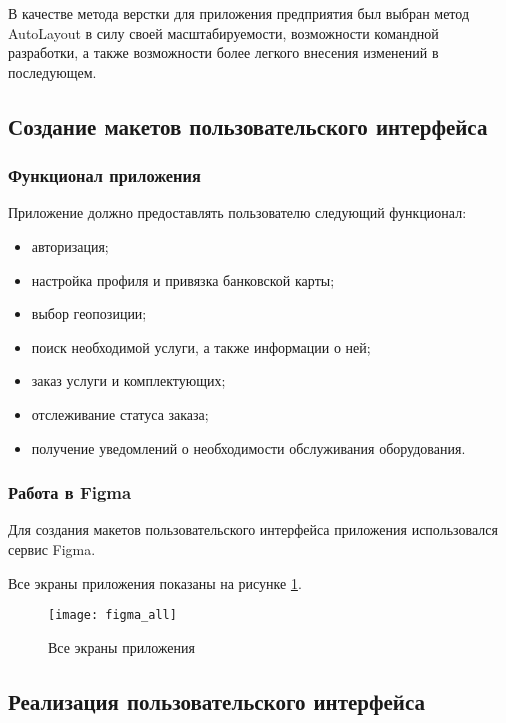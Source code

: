 В качестве метода верстки для приложения предприятия был выбран метод AutoLayout в силу своей масштабируемости, возможности командной разработки, а также возможности более легкого внесения изменений в последующем. 

\subsection{Создание макетов пользовательского интерфейса}

\subsubsection{Функционал приложения}

Приложение должно предоставлять пользователю следующий функционал:

\begin{itemize}[label=---]
	\item авторизация;
	\item настройка профиля и привязка банковской карты;
	\item выбор геопозиции;	 
	\item поиск необходимой услуги, а также информации о ней;
	\item заказ услуги и комплектующих;
	\item отслеживание статуса заказа;
	\item получение уведомлений о необходимости обслуживания оборудования.
\end{itemize}

\subsubsection{Работа в Figma}

Для создания макетов пользовательского интерфейса приложения использовался сервис Figma\cite{figma}.

Все экраны приложения показаны на рисунке \ref{figma_all}.

\begin{figure}[H]
	\centering
	\texttt{[image: figma\_all]}
	\caption{Все экраны приложения}
	\label{figma_all}
\end{figure}

\subsection{Реализация пользовательского интерфейса}


